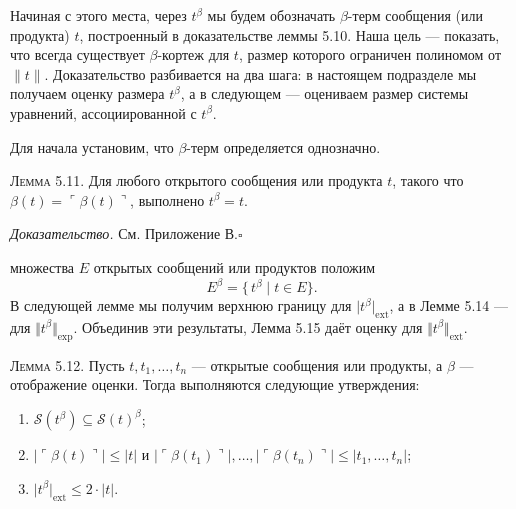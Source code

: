 Начиная с этого места, через $t^{\beta}$ мы будем обозначать
$\beta$-терм сообщения (или продукта) $t$, построенный в доказательстве
леммы 5.10.
Наша цель — показать, что всегда существует $\beta$-кортеж для $t$,
размер которого ограничен полиномом от $\lVert t\rVert$.
Доказательство разбивается на два шага:
в настоящем подразделе мы получаем оценку размера $t^{\beta}$,
а в следующем — оцениваем размер системы уравнений,
ассоциированной с $t^{\beta}$.

Для начала установим, что $\beta$-терм определяется однозначно.

\textsc{Лемма 5.11.}
Для любого открытого сообщения или продукта $t$,
такого что $\beta(t)=\ulcorner\beta(t)\urcorner$, выполнено $t^{\beta}=t$.

\textit{Доказательство.} См. Приложение В.\hfill$\square$

 множества $E$ открытых сообщений или продуктов положим
\[
  E^{\beta}=\{\,t^{\beta}\mid t\in E\}.
\]
В следующей лемме мы получим верхнюю границу для
$\lvert t^{\beta}\rvert_{\text{ext}}$,
а в Лемме 5.14 — для $\Vert t^{\beta}\Vert_{\text{exp}}$.
Объединив эти результаты, Лемма 5.15 даёт оценку
для $\Vert t^{\beta}\Vert_{\text{ext}}$.

\textsc{Лемма 5.12.}
Пусть $t,t_{1},\dots,t_{n}$ — открытые сообщения или продукты,
а $\beta$ — отображение оценки.
Тогда выполняются следующие утверждения:

\begin{enumerate}\itemsep0pt
\item $\mathcal S(t^{\beta}) \subseteq \mathcal S(t)^{\beta}$;
\item $\lvert\ulcorner\beta(t)\urcorner\rvert \le \lvert t\rvert$
      и
      $\lvert\ulcorner\beta(t_{1})\urcorner\rvert,\dots,
       \lvert\ulcorner\beta(t_{n})\urcorner\rvert
       \le \lvert t_{1},\dots,t_{n}\rvert$;
\item $\lvert t^{\beta}\rvert_{\text{ext}} \le 2\cdot\lvert t\rvert$.
\end{enumerate}

